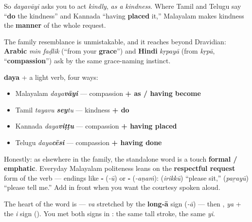 So \emph{dayavāyi} asks you to act \emph{kindly}, \emph{as a kindness}. Where Tamil and Telugu say \textquotedblleft{}\textbf{do} the kindness\textquotedblright{} and Kannada \textquotedblleft{}having \textbf{placed} it,\textquotedblright{} Malayalam makes kindness the \textbf{manner} of the whole request.

The family resemblance is unmistakable, and it reaches beyond Dravidian: \textbf{Arabic} \emph{min faḍlik} (\textquotedblleft{}from your \textbf{grace}\textquotedblright{}) and \textbf{Hindi} \emph{kṛpayā} (from \emph{kṛpā}, \textquotedblleft{}\textbf{compassion}\textquotedblright{}) ask by the same grace-naming instinct.

\begin{culture}
\textbf{daya} + a light verb, four ways:

\begin{itemize}
\raggedright
  \item Malayalam \textbf{} \emph{daya\textbf{vāyi}} — compassion \textbf{+ as / having become}
  \item Tamil \textbf{} \emph{tayavu \textbf{sey}tu} — kindness \textbf{+ do}
  \item Kannada \textbf{} \emph{daya\textbf{viṭṭu}} — compassion \textbf{+ having placed}
  \item Telugu \textbf{} \emph{daya\textbf{cēsi}} — compassion \textbf{+ having done}
\end{itemize}
\end{culture}

\begin{culture}
Honestly: as elsewhere in the family, the standalone word is a touch \textbf{formal / emphatic}. Everyday Malayalam politeness leans on the \textbf{respectful request} form of the verb — endings like \textbf{‑} (\emph{-ū}) or \textbf{‑} (\emph{-aṇaṁ}): \textbf{} (\emph{irikkū}) \textquotedblleft{}please sit,\textquotedblright{} \textbf{} (\emph{paṟayū}) \textquotedblleft{}please tell me.\textquotedblright{} Add \textbf{} in front when you want the courtesy spoken aloud.
\end{culture}

\begin{cousinweb}
The heart of the word is \textbf{} — \emph{va} stretched by the \textbf{long‑ā} sign \textbf{} (\emph{-ā}) — then \textbf{}, \emph{ya} + the \emph{i} sign (\textbf{}). You met both signs in \textbf{ }: the same tall stroke, the same \emph{yi}.
\end{cousinweb}

